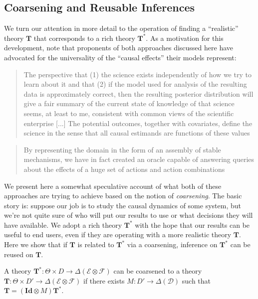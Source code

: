 
\subsection{Coarsening and Reusable Inferences}

We turn our attention in more detail to the operation of finding a ``realistic'' theory $\mathbf{T}$ that corresponds to a rich theory $\mathbf{T}^*$. As a motivation for this development, note that proponents of both approaches discussed here have advocated for the universality of the ``causal effects'' their models represent:

\begin{quote}
The perspective that (1) the science exists independently of how we try to learn about it and that (2) if the model used for analysis of the resulting data is approximately correct, then the resulting posterior distribution will give a fair summary of the current state of knowledge of that science seems, at least to me, consistent with common views of the scientific enterprise
[...]
The potential outcomes, together with covariates, define the science in the sense that all causal estimands are functions of these values \citep{rubin_causal_2005}
\end{quote}

\begin{quote}
By representing the domain in the form of an assembly of stable mechanisms, we have in fact created an oracle capable of answering queries about the effects of a huge set of actions and action combinations \citep{pearl_causality:_2009}
\end{quote}

We present here a somewhat speculative account of what both of these approaches are trying to achieve based on the notion of \emph{coarsening}. The basic story is: suppose our job is to study the causal dynamics of some system, but we're not quite sure of who will put our results to use or what decisions they will have available. We adopt a rich theory $\mathbf{T}^*$ with the hope that our results can be useful to end users, even if they are operating with a more realistic theory $\mathbf{T}$. Here we show that if $\mathbf{T}$ is related to $\mathbf{T}^*$ via a coarsening, inference on $\mathbf{T}^*$ can be reused on $\mathbf{T}$.

\begin{definition}[Coarsening]
A theory $\mathbf{T}^*:\Theta\times D\to \Delta(\mathcal{E}\otimes\mathcal{F})$ can be coarsened to a theory $\mathbf{T}:\Theta\times D'\to \Delta(\mathcal{E}\otimes\mathcal{F})$ if there exists $M:D'\to \Delta(\mathcal{D})$ such that $\mathbf{T}  = (\mathbf{Id} \otimes M) \mathbf{T}^*$.
\end{definition}


